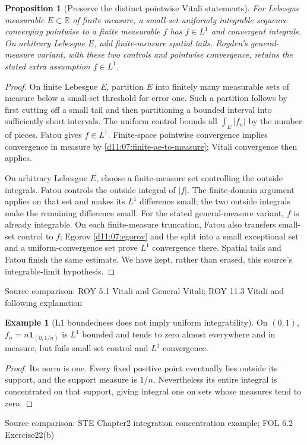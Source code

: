 \documentclass[11pt,oneside,openany]{book}
\newtheorem{proposition}[theorem]{Proposition}
\theoremstyle{definition}
\newtheorem{example}[theorem]{Example}
\theoremstyle{remark}
\newcommand{\R}{\mathbb R}\newcommand{\C}{\mathbb C}
\newcommand{\one}{\mathbf1}\newcommand{\ind}[1]{\mathbf1_{#1}}
\newcommand{\family}[1]{}
\newcommand{\source}[1]{\par\begingroup\small\sffamily\color{black!65}Source comparison: #1\par\endgroup}
\begin{document}
\begin{proposition}[Preserve the distinct pointwise Vitali statements]\family{D11.17.royden_vitali_versions}\label{d11:17:royden-vitali-versions}
For Lebesgue measurable $E\subset\R$ of finite measure, a small-set uniformly integrable sequence converging pointwise to a finite measurable $f$ has $f\in L^1$ and convergent integrals. On arbitrary Lebesgue $E$, add finite-measure spatial tails. Royden's general-measure variant, with these two controls and pointwise convergence, retains the stated extra assumption $f\in L^1$.
\end{proposition}
\begin{proof}
On finite Lebesgue $E$, partition $E$ into finitely many measurable sets of measure below a small-set threshold for error one. Such a partition follows by first cutting off a small tail and then partitioning a bounded interval into sufficiently short intervals. The uniform control bounds all $\int_E|f_n|$ by the number of pieces. Fatou gives $f\in L^1$. Finite-space pointwise convergence implies convergence in measure by \cref{d11:07:finite-ae-to-measure}; Vitali convergence then applies.

On arbitrary Lebesgue $E$, choose a finite-measure set controlling the outside integrals. Fatou controls the outside integral of $|f|$. The finite-domain argument applies on that set and makes its $L^1$ difference small; the two outside integrals make the remaining difference small. For the stated general-measure variant, $f$ is already integrable. On each finite-measure truncation, Fatou also transfers small-set control to $f$; Egorov \cref{d11:07:egorov} and the split into a small exceptional set and a uniform-convergence set prove $L^1$ convergence there. Spatial tails and Fatou finish the same estimate. We have kept, rather than erased, this source's integrable-limit hypothesis.
\end{proof}
\source{ROY 5.1 Vitali and General Vitali; ROY 11.3 Vitali and following explanation}

\begin{example}[L1 boundedness does not imply uniform integrability]\family{D11.17.spikes_counterexample}\label{d11:17:spikes-counterexample}
On $(0,1)$, $f_n=n\one_{(0,1/n)}$ is $L^1$ bounded and tends to zero almost everywhere and in measure, but fails small-set control and $L^1$ convergence.
\end{example}
\begin{proof}
Its norm is one. Every fixed positive point eventually lies outside its support, and the support measure is $1/n$. Nevertheless its entire integral is concentrated on that support, giving integral one on sets whose measures tend to zero.
\end{proof}
\source{STE Chapter2 integration concentration example; FOL 6.2 Exercise22(b)}
\end{document}
